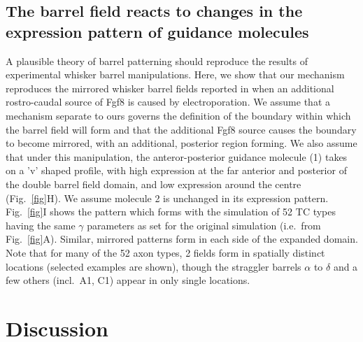 \documentclass[9pt,twocolumn,twoside,lineno]{pnas-new}
\begin{document}
\subsection*{The barrel field reacts to changes in the expression pattern of guidance molecules}

A plausible theory of barrel patterning should reproduce the results of
experimental whisker barrel manipulations.
%
Here, we show that our mechanism reproduces the mirrored whisker barrel fields
reported in \cite{shimogori_fibroblast_2005,assimacopoulos_fibroblast_2012}
when an additional rostro-caudal source of Fgf8 is caused by
electroporation. We assume that a mechanism separate to ours governs the
definition of the boundary within which the barrel field will form and that
the additional Fgf8 source causes the boundary to become mirrored, with an
additional, posterior region forming. We also assume that under this
manipulation, the anteror-posterior guidance molecule (1) takes on a 'v'
shaped profile, with high expression at the far anterior and posterior of the
double barrel field domain, and low expression around the centre
(Fig.~\ref{fig}H). We assume molecule 2 is unchanged in its expression
pattern. Fig.~\ref{fig}I shows the pattern which forms with the simulation of
52 TC types having the same $\gamma$ parameters as set for the original
simulation (i.e.~from Fig.~\ref{fig}A). Similar, mirrored patterns form in
each side of the expanded domain. Note that for many of the 52 axon types, 2
fields form in spatially distinct locations (selected examples are shown),
though the straggler barrels $\alpha$ to $\delta$ and a few others (incl.~A1,
C1) appear in only single locations.

\section*{Discussion}
\end{document}
